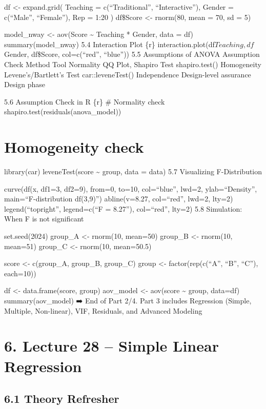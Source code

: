 \documentclass[
  letterpaper,
  DIV=11,
  numbers=noendperiod]{scrreprt}
\begin{document}
df \textless- expand.grid( Teaching = c(``Traditional'',
``Interactive''), Gender = c(``Male'', ``Female''), Rep = 1:20 )
df\$Score \textless- rnorm(80, mean = 70, sd = 5)

model\_nway \textless- aov(Score \textasciitilde{} Teaching * Gender,
data = df) summary(model\_nway) 5.4 Interaction Plot \{r\}
interaction.plot(df\(Teaching, df\)Gender, df\$Score, col=c(``red'',
``blue'')) 5.5 Assumptions of ANOVA Assumption Check Method Tool
Normality QQ Plot, Shapiro Test shapiro.test() Homogeneity
Levene's/Bartlett's Test car::leveneTest() Independence Design-level
assurance Design phase

5.6 Assumption Check in R \{r\} \# Normality check
shapiro.test(residuals(anova\_model))


\chapter{Homogeneity check}\label{homogeneity-check}

library(car) leveneTest(score \textasciitilde{} group, data = data) 5.7
Visualizing F-Distribution

curve(df(x, df1=3, df2=9), from=0, to=10, col=``blue'', lwd=2,
ylab=``Density'', main=``F-distribution df(3,9)'') abline(v=8.27,
col=``red'', lwd=2, lty=2) legend(``topright'', legend=c(``F = 8.27''),
col=``red'', lty=2) 5.8 Simulation: When F is not significant

set.seed(2024) group\_A \textless- rnorm(10, mean=50) group\_B
\textless- rnorm(10, mean=51) group\_C \textless- rnorm(10, mean=50.5)

score \textless- c(group\_A, group\_B, group\_C) group \textless-
factor(rep(c(``A'', ``B'', ``C''), each=10))

df \textless- data.frame(score, group) aov\_model \textless- aov(score
\textasciitilde{} group, data=df) summary(aov\_model) ➡️ End of Part
2/4. Part 3 includes Regression (Simple, Multiple, Non-linear), VIF,
Residuals, and Advanced Modeling


\chapter{6. Lecture 28 -- Simple Linear
Regression}\label{lecture-28-simple-linear-regression}

\section{6.1 Theory Refresher}\label{theory-refresher}
\end{document}
